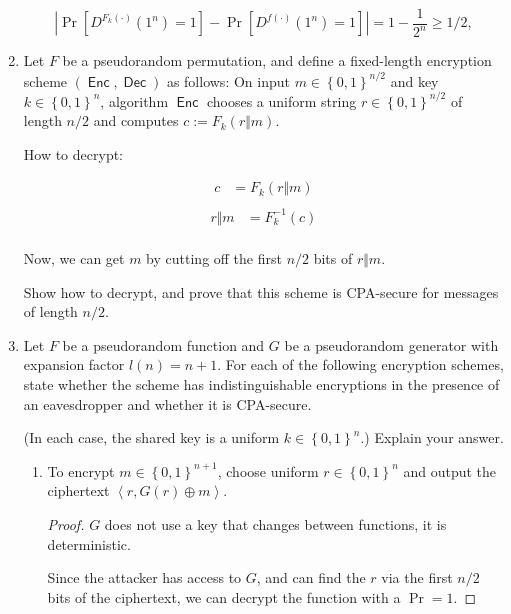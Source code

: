 \documentclass{article}
\DeclareMathOperator{\Enc}{\textsf{Enc}}
\DeclareMathOperator{\Dec}{\textsf{Dec}}
\begin{document}
\begin{enumerate}
    \[
        \left| \Pr\left[D^{F_k(\cdot)}(1^n) = 1\right] -
      \Pr\left[D^{f(\cdot)}(1^n) = 1\right] \right| 
      = 1 - \frac{1}{2^n}
      \geq 1/2,
      \]
    
  \item Let $F$ be a pseudorandom permutation, and define a fixed-length
    encryption scheme $(\Enc, \Dec)$ as follows: On input $m \in
    \left\{0, 1\right\}^{n / 2}$ and key $k \in \left\{0, 1\right\}^n$,
    algorithm $\Enc$ chooses a uniform string $r \in \left\{0,
    1\right\}^{n/2}$ of length $n/2$ and computes $c := F_k(r \Vert m)$.

    How to decrypt:

    \begin{align*}
      c &= F_k(r \Vert m)\\
    \end{align*}
    \begin{align*}
      r \Vert m &= F^{-1}_k(c)\\
    \end{align*}

    Now, we can get $m$ by cutting off the first $n / 2$ bits of $r \Vert m$.

    Show how to decrypt, and prove that this scheme is CPA-secure for
    messages of length $n / 2$.
  \item Let $F$ be a pseudorandom function and $G$ be a pseudorandom generator
    with expansion factor $l(n) = n + 1$. For each of the following encryption
    schemes, state whether the scheme has indistinguishable encryptions in the
    presence of an eavesdropper and whether it is CPA-secure.

    (In each case, the shared key is a uniform $k \in \left\{0, 1\right\}^n$.)
    Explain your answer.


    \begin{enumerate}
      \item To encrypt $m \in \left\{0, 1\right\}^{n + 1}$, choose uniform $r
        \in \left\{0, 1\right\}^n$ and output the ciphertext $\left\langle r,
          G(r) \oplus m\right\rangle$.

          \begin{proof}
            $G$ does not use a key that changes between functions, it is
            deterministic.

            Since the attacker has access to $G$, and can find the $r$ via the
            first $n / 2$ bits of the ciphertext, we can decrypt the function
            with a $\Pr = 1$.


\end{proof}
\end{enumerate}
\end{enumerate}
\end{document}
